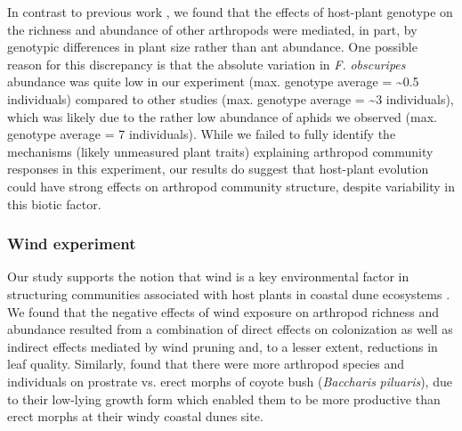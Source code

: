 \documentclass[11pt]{article}
\begin{document}
In contrast to previous work
\cite{Johnson_2008}\cite{Mooney_2008}\cite{Mooney_2008}, we found that the
effects of host-plant genotype on the richness and abundance of other
arthropods were mediated, in part, by genotypic differences in plant
size rather than ant abundance. One possible reason for this discrepancy
is that the absolute variation in \emph{F.} \emph{obscuripes} abundance
was quite low in our experiment (max. genotype average =
\textasciitilde{}0.5 individuals) compared to other studies (max.
genotype average = \textasciitilde{}3 individuals), which was likely due
to the rather low abundance of aphids we observed (max. genotype average
= 7 individuals). While we failed to fully identify the mechanisms
(likely unmeasured plant traits) explaining arthropod community
responses in this experiment, our results do suggest that host-plant
evolution could have strong effects on arthropod community structure,
despite variability in this biotic factor.

\subsubsection*{Wind experiment}

Our study supports the notion that wind is a key environmental factor in
structuring communities associated with host plants in coastal dune
ecosystems \cite{Miller_1999}\cite{Crutsinger_2010}\cite{Crutsinger_2014}. We found
that the negative effects of wind exposure on arthropod richness and
abundance resulted from a combination of direct effects on colonization
as well as indirect effects mediated by wind pruning and, to a lesser
extent, reductions in leaf quality. Similarly, \cite{Crutsinger_2014} found
that there were more arthropod species and individuals on prostrate vs.
erect morphs of coyote bush (\emph{Baccharis} \emph{piluaris}), due to
their low-lying growth form which enabled them to be more productive
than erect morphs at their windy coastal dunes site.
\end{document}
